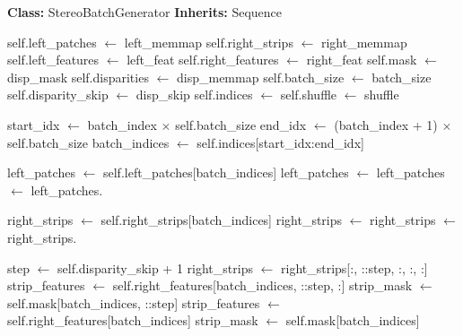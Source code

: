 \documentclass[12pt]{article}
\begin{document}
\begin{algorithm}[H]
\caption{Stereo Batch Generator}
\begin{algorithmic}[1]
\State \textbf{Class:} StereoBatchGenerator
\State \textbf{Inherits:} Sequence 

    \State self.left\_patches $\gets$ left\_memmap 
    \State self.right\_strips $\gets$ right\_memmap 
    \State self.left\_features $\gets$ left\_feat 
    \State self.right\_features $\gets$ right\_feat 
    \State self.mask $\gets$ disp\_mask 
    \State self.disparities $\gets$ disp\_memmap 
    \State self.batch\_size $\gets$ batch\_size
    \State self.disparity\_skip $\gets$ disp\_skip 
    \State self.indices $\gets$  
    \State self.shuffle $\gets$ shuffle
    \State {} 
\EndProcedure

    \State \Return {} 
\EndFunction

    \State {}
    \State start\_idx $\gets$ batch\_index $\times$ self.batch\_size
    \State end\_idx $\gets$ (batch\_index + 1) $\times$ self.batch\_size
    \State batch\_indices $\gets$ self.indices[start\_idx:end\_idx]
    
    \State {}
    \State left\_patches $\gets$ self.left\_patches[batch\_indices]
    \State left\_patches $\gets$  
    \State left\_patches $\gets$ left\_patches. 
    
    \State {}
    \State right\_strips $\gets$ self.right\_strips[batch\_indices]
    \State right\_strips $\gets$ 
    \State right\_strips $\gets$ right\_strips.
    
    \State {}
        \State step $\gets$ self.disparity\_skip + 1
        \State right\_strips $\gets$ right\_strips[:, ::step, :, :, :] 
        \State strip\_features $\gets$ self.right\_features[batch\_indices, ::step, :]
        \State strip\_mask $\gets$ self.mask[batch\_indices, ::step]
    \Else
        \State strip\_features $\gets$ self.right\_features[batch\_indices]
        \State strip\_mask $\gets$ self.mask[batch\_indices]
    \EndIf
    

\end{algorithmic}
\end{algorithm}
\end{document}
